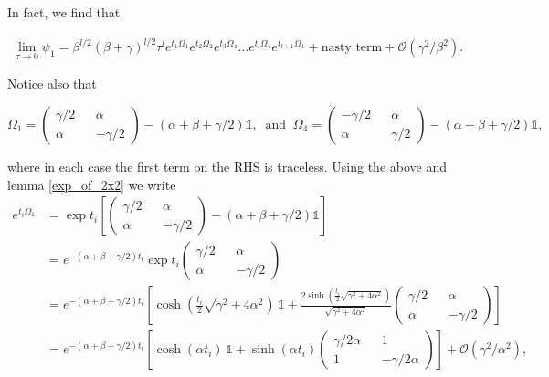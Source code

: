 \documentclass{article}
\begin{document}
In fact, we find that 

\begin{align}\label{sandwiched_to_gamma2}
\lim_{\tau \rightarrow 0} \psi_1 = \beta^{l/2}(\beta+\gamma)^{l/2}\tau^l e^{t_1\Omega_1}e^{t_2\Omega_2}e^{t_3\Omega_4}\ldots e^{t_l\Omega_4}e^{t_{l+1}\Omega_1} + \text{nasty term} + \mathcal{O}(\gamma^2/\beta^2).
\end{align}

Notice also that

\begin{equation}
  \Omega_1 = \begin{pmatrix} \gamma/2 && \alpha \\ \alpha && -\gamma/2 \end{pmatrix}
  - (\alpha +\beta +\gamma/2)\mathbb{1}, \; \; \text{and} \; \;
    \Omega_4 = \begin{pmatrix} -\gamma/2 && \alpha \\ \alpha && \gamma/2 \end{pmatrix} -
    (\alpha +\beta +\gamma/2)\mathbb{1},
\end{equation}

where in each case the first term on the RHS is traceless. Using the above and lemma \ref{exp_of_2x2} we write
\begin{align}
  e^{t_i\Omega_1} &=  \exp{ t_i\left[ \begin{pmatrix} \gamma/2 && \alpha \\ \alpha && -\gamma/2 \end{pmatrix}
  - (\alpha +\beta +\gamma/2)\mathbb{1}\right]} \nonumber\\
  &= e^{-(\alpha +\beta+\gamma/2)t_i}\exp{t_i \begin{pmatrix} \gamma/2 && \alpha \\ \alpha && -\gamma/2 \end{pmatrix}} \nonumber\\
  &= e^{-(\alpha +\beta+\gamma/2)t_i}\left [\cosh {\left(\frac{t_i}{2}\sqrt{\gamma^2 +4\alpha^2}\right)}\,\mathbb{1}
  + \frac{2\sinh{\left(\frac{t_i}{2}\sqrt{\gamma^2+4\alpha^2}\right)}}{\sqrt{\gamma^2+4\alpha^2}}\begin{pmatrix} \gamma/2 && \alpha \\ \alpha && -\gamma/2 \end{pmatrix} \right] \nonumber \\
  &= e^{-(\alpha +\beta+\gamma/2)t_i} \left[\cosh {(\alpha t_i)}\,\mathbb{1}
  + \sinh(\alpha t_i)\begin{pmatrix} \gamma/2\alpha && 1 \\ 1 && -\gamma/2\alpha \end{pmatrix} \right] + \mathcal{O}(\gamma^2/\alpha^2)
  ,
\end{align}
\end{document}
